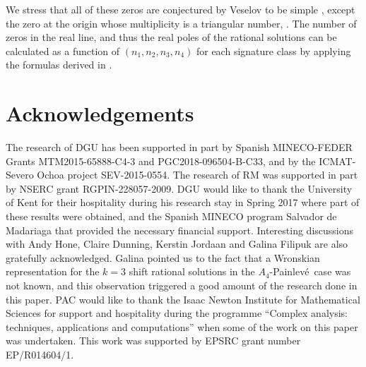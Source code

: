 \documentclass[10pt]{amsart}
\theoremstyle{definition}
\numberwithin{equation}{section}
\numberwithin{figure}{section}
\newcommand{\p}{Painlev\'{e}}
\begin{document}
We stress that all of these zeros are conjectured by Veselov to be simple \cite{FelderHemeryVeselov}, except the zero at the origin whose multiplicity is a triangular number, \cite{bonneux2019coefficients}. The number of zeros in the real line, and thus the real poles of the rational solutions can be calculated as a function of $(n_1,n_2,n_3,n_4)$ for each signature class by applying the formulas derived in \cite{garcia2015oscillation}. 
\section{Acknowledgements}

The research of DGU has been supported in part by Spanish MINECO-FEDER
Grants MTM2015-65888-C4-3 and PGC2018-096504-B-C33, and by the ICMAT-Severo Ochoa project
SEV-2015-0554. The research of RM was supported in part by NSERC grant
RGPIN-228057-2009. DGU would like to thank the University of Kent for their hospitality during his research stay in Spring 2017 where part of these results were obtained, and the Spanish MINECO program Salvador de Madariaga that provided the necessary financial support. Interesting discussions with Andy Hone, Claire Dunning, Kerstin Jordaan and Galina Filipuk are also gratefully acknowledged. Galina pointed us to the fact that a Wronskian representation for the $k=3$ shift rational solutions in the $A_4$-\p\ case was not known, and this observation  triggered a good amount of the research done in this paper.
PAC would like to thank the Isaac Newton Institute for Mathematical
Sciences for support and hospitality during the programme ``Complex analysis: techniques, applications
and computations'' when some of the work on this paper was undertaken. This work was supported
by  EPSRC grant number EP/R014604/1.


%

\end{document}
